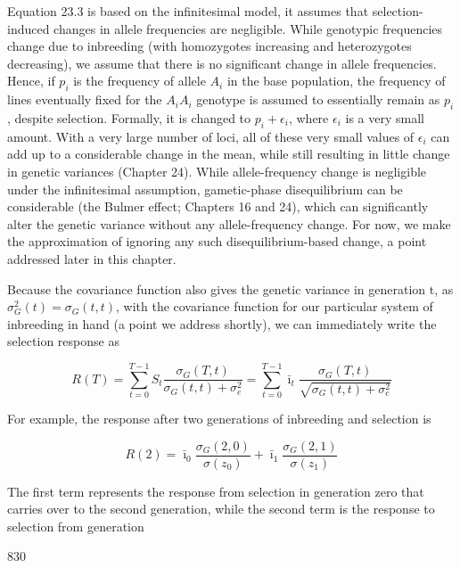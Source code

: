 \documentclass{article}
\begin{document}
Equation 23.3 is based on the infinitesimal model, it assumes that selection-induced changes in allele frequencies are negligible. While genotypic frequencies change due to inbreeding (with homozygotes increasing and heterozygotes decreasing), we assume that there is no significant change in allele frequencies. Hence, if  $ p_i $ is the frequency of allele  $ A_i $ in the base population, the frequency of lines eventually fixed for the  $ A_i A_i $ genotype is assumed to essentially remain as  $ p_i $, despite selection. Formally, it is changed to  $ p_i + \epsilon_i $, where  $ \epsilon_i $ is a very small amount. With a very large number of loci, all of these very small values of  $ \epsilon_i $ can add up to a considerable change in the mean, while still resulting in little change in genetic variances (Chapter 24). While allele-frequency change is negligible under the infinitesimal assumption, gametic-phase disequilibrium can be considerable (the Bulmer effect; Chapters 16 and 24), which can significantly alter the genetic variance without any allele-frequency change. For now, we make the approximation of ignoring any such disequilibrium-based change, a point addressed later in this chapter.

Because the covariance function also gives the genetic variance in generation t, as  $ \sigma_{G}^{2}(t) = \sigma_{G}(t, t) $, with the covariance function for our particular system of inbreeding in hand (a point we address shortly), we can immediately write the selection response as

\begin{equation}
R(T)=\sum_{t=0}^{T-1}S_{t}\frac{\sigma_{G}(T,t)}{\sigma_{G}(t,t)+\sigma_{e}^{2}}=\sum_{t=0}^{T-1}\bar{\imath}_{t}\frac{\sigma_{G}(T,t)}{\sqrt{\sigma_{G}(t,t)+\sigma_{e}^{2}}}
\tag{23.4}
\label{eq:23_4}
\end{equation}

For example, the response after two generations of inbreeding and selection is

\begin{equation}
R(2)=\bar{\imath}_{0}\frac{\sigma_{G}(2,0)}{\sigma(z_{0})}+\bar{\imath}_{1}\frac{\sigma_{G}(2,1)}{\sigma(z_{1})}
\tag{23.5a}
\label{eq:23_5a}
\end{equation}

The first term represents the response from selection in generation zero that carries over to the second generation, while the second term is the response to selection from generation

830
\end{document}
